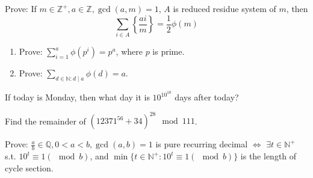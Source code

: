 \documentclass{ctexart}
\newif\ifpreface
\begin{document}
\large
\setlength{\baselineskip}{1.2em}
\ifpreface

\else
{}
\begin{problem}\label{pro:p42.2}
  Prove: If \(m \in \mathbb{Z}^{+},a \in \mathbb{Z}, \gcd(a,m)=1\), \(A\) is reduced residue system of \(m\), then
  \[
    \sum_{i \in A}\left\{\frac{ai}{m}\right\} = \frac{1}{2} \phi(m)
  \]
\end{problem}
\begin{solution}

\end{solution}
\begin{problem}\label{pro:42.3}
  \begin{enumerate}
    \item Prove: \(\sum_{i=1}^{a}\phi(p^i)=p^a\), where \(p\) is prime.
    \item Prove: \(\sum_{d \in \mathbb{N}: d \mid a}\phi(d)=a\).
  \end{enumerate}
\end{problem}
\begin{problem}\label{pro:45.1}
  If today is Monday, then what day it is \(10^{10^{10}}\) days after today?
\end{problem}
\begin{problem}\label{pro:45.1}
  Find the remainder of \((12371^{56} + 34)^{28} \mod 111 \).
\end{problem}
\begin{problem}\label{pro:45.4}
  Prove: \(\frac{a}{b} \in \mathbb{Q}, 0 < a<b , \gcd(a,b)=1\) is pure recurring decimal \(\iff\)
  \(\exists t \in \mathbb{N}^+\) s.t. \(10^t \equiv 1(\mod b)\), and \(\min\{t \in \mathbb{N}^+: 10^t \equiv 1(\mod b)\}\) is the length of cycle section.
\end{problem}
\end{document}

